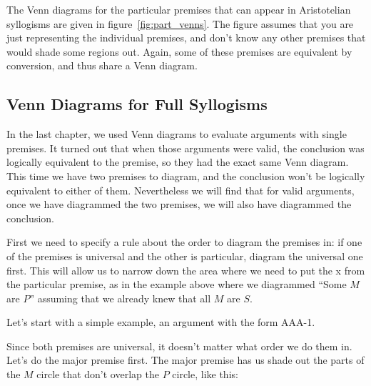 

The Venn diagrams for the particular premises that can appear in Aristotelian syllogisms are given in figure~\ref{fig:part_venns}. The figure assumes that you are just representing the individual premises, and don't know any other premises that would shade some regions out. Again, some of these premises are equivalent by conversion, and thus share a Venn diagram.



\subsection{Venn Diagrams for Full Syllogisms}

In the last chapter, we used Venn diagrams to evaluate arguments with single premises. It turned out that when those arguments were valid, the conclusion was logically equivalent to the premise, so they had the exact same Venn diagram. This time we have two premises to diagram, and the conclusion won't be logically equivalent to either of them. Nevertheless we will find that for valid arguments, once we have diagrammed the two premises, we will also have diagrammed the conclusion.

First we need to specify a rule about the order to diagram the premises in: if one of the premises is universal and the other is particular, diagram the universal one first. This will allow us to narrow down the area where we need to put the x from the particular premise, as in the example above where we diagrammed ``Some $M$ are $P$'' assuming that we already knew that all $M$ are $S$.

Let's start with a simple example, an argument with the form AAA-1.

\begin{kormanize}
\end{kormanize}

Since both premises are universal, it doesn't matter what order we do them in. Let's do the major premise first. The major premise has us shade out the parts of the $M$ circle that don't overlap the $P$ circle, like this:


